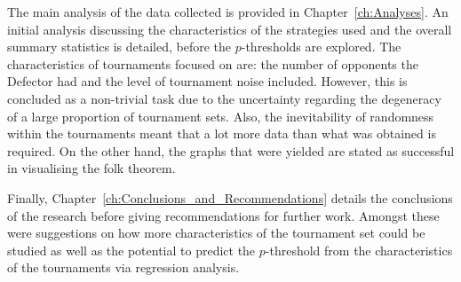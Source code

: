 The main analysis of the data collected is provided in
Chapter~\ref{ch:Analyses}. An initial analysis discussing the characteristics of
the strategies used and the overall summary statistics is detailed, before the
\(p\)-thresholds are explored. The characteristics of tournaments focused on
are: the number of opponents the Defector had and the level of tournament noise
included. However, this is concluded as a non-trivial task due to the
uncertainty regarding the degeneracy of a large proportion of tournament sets.
Also, the inevitability of randomness within the tournaments meant that a lot
more data than what was obtained is required. On the other hand, the graphs that
were yielded are stated as successful in visualising the folk theorem.

Finally, Chapter~\ref{ch:Conclusions_and_Recommendations} details the
conclusions of the research before giving recommendations for further work.
Amongst these were suggestions on how more characteristics of the tournament set
could be studied as well as the potential to predict the \(p\)-threshold from
the characteristics of the tournaments via regression analysis.